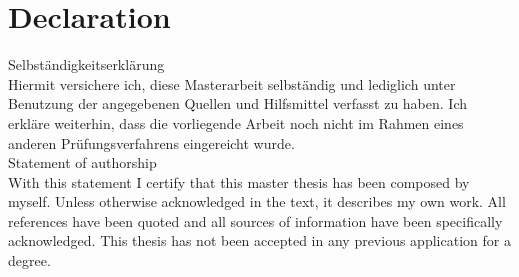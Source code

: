 \chapter*{Declaration}
\thispagestyle{empty}

Selbst{\"a}ndigkeitserkl{\"a}rung \\
Hiermit versichere ich, diese Masterarbeit selbst{\"a}ndig und lediglich unter Benutzung der angegebenen Quellen und Hilfsmittel verfasst zu haben. 
Ich erkl{\"a}re weiterhin, dass die vorliegende Arbeit noch nicht im Rahmen eines anderen Pr{\"u}fungsverfahrens eingereicht wurde.\\

\noindent Statement of authorship \\
With this statement I certify that this master thesis has been composed by myself. Unless otherwise acknowledged in the text, it describes my own work. All references have been quoted and all sources of information have been specifically acknowledged. This thesis has not been accepted in any previous application for a degree.  
